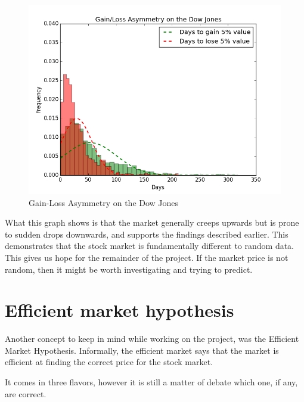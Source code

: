\documentclass{report}
\begin{document}
\begin{figure}[H]
	\caption{Gain-Loss Asymmetry on the Dow Jones}
	\centerline{\includegraphics[width=\textwidth]{vis/gain_loss_asymmetry.png}}
	\label{fig:gain-loss-asymm}
\end{figure}

What this graph shows is that the market generally creeps upwards but is prone to sudden drops downwards, and supports the findings described earlier. This demonstrates that the stock market is fundamentally different to random data. This gives us hope for the remainder of the project. If the market price is not random, then it might be worth investigating and trying to predict.

\section{Efficient market hypothesis}

Another concept to keep in mind while working on the project, was the Efficient Market Hypothesis. Informally, the efficient market says that the market is efficient at finding the correct price for the stock market.

It comes in three flavors, however it is still a matter of debate which one, if any, are correct.
\end{document}
